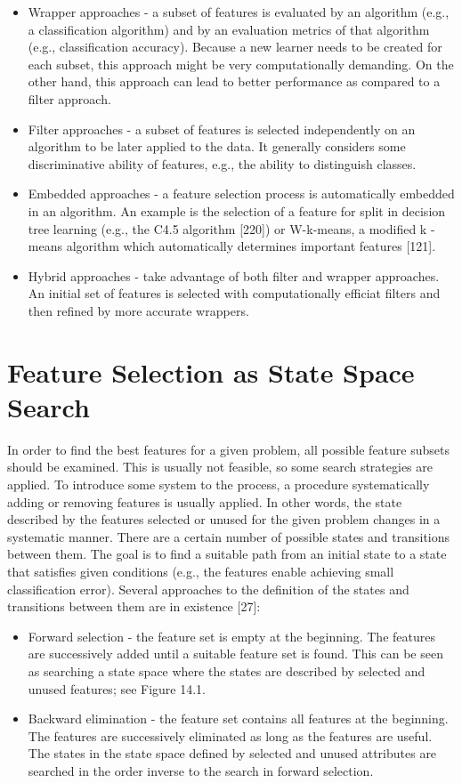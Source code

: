 \documentclass[11pt,openany,executivepaper]{book}
\begin{document}
\begin{itemize}
  \item Wrapper approaches - a subset of features is evaluated by an algorithm (e.g., a classification algorithm) and by an evaluation metrics of that algorithm (e.g., classification accuracy). Because a new learner needs to be created for each subset, this approach might be very computationally demanding. On the other hand, this approach can lead to better performance as compared to a filter approach.
  \item Filter approaches - a subset of features is selected independently on an algorithm to be later applied to the data. It generally considers some discriminative ability of features, e.g., the ability to distinguish classes.
  \item Embedded approaches - a feature selection process is automatically embedded in an algorithm. An example is the selection of a feature for split in decision tree learning (e.g., the C4.5 algorithm [220]) or W-k-means, a modified k -means algorithm which automatically determines important features [121].
  \item Hybrid approaches - take advantage of both filter and wrapper approaches. An initial set of features is selected with computationally efficiat filters and then refined by more accurate wrappers.
\end{itemize}

\section{Feature Selection as State Space Search}
In order to find the best features for a given problem, all possible feature subsets should be examined. This is usually not feasible, so some search strategies are applied. To introduce some system to the process, a procedure systematically adding or removing features is usually applied. In other words, the state described by the features selected or unused for the given problem changes in a systematic manner. There are a certain number of possible states and transitions between them. The goal is to find a suitable path from an initial state to a state that satisfies given conditions (e.g., the features enable achieving small classification error). Several approaches to the definition of the states and transitions between them are in existence [27]:

\begin{itemize}
  \item Forward selection - the feature set is empty at the beginning. The features are successively added until a suitable feature set is found. This can be seen as searching a state space where the states are described by selected and unused features; see Figure 14.1.
  \item Backward elimination - the feature set contains all features at the beginning. The features are successively eliminated as long as the features are useful. The states in the state space defined by selected and unused attributes are searched in the order inverse to the search in forward selection.
\end{itemize}
\end{document}
